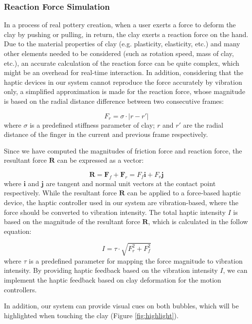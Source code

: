 \documentclass{svjour3}                     %
\begin{document}
\subsubsection{Reaction Force Simulation}
{\color{blue}
In a process of real pottery creation, when a user exerts a force to deform the clay by pushing or pulling, in return, the clay exerts a reaction force on the hand.
%
Due to the material properties of clay (e.g. plasticity, elasticity, etc.) and many other elements needed to be considered (such as rotation speed, mass of clay, etc.), an accurate calculation of the reaction force can be quite complex, which might be an overhead for real-time interaction.
%
In addition, considering that the haptic devices in our system cannot reproduce the force accurately by vibration only, a simplified approximation is made for the reaction force, whose magnitude is based on the radial distance difference between two consecutive frames:

\begin{equation}
F_{r} = \sigma \cdot |r - r'|
\end{equation}
where $\sigma$ is a predefined stiffness parameter of clay; $r$ and $r'$ are the radial distance of the finger in the current and previous frame respectively.

Since we have computed the magnitudes of friction force and reaction force, the resultant force $\mathbf{R}$ can be expressed as a vector:

\begin{equation}
\mathbf{R} = \mathbf{F}_{f} + \mathbf{F}_{r} = F_{f} \mathbf{i} + F_{r} \mathbf{j}
\end{equation}
where $\mathbf{i}$ and $\mathbf{j}$ are tangent and normal unit vectors at the contact point respectively.
While the resultant force $\mathbf{R}$ can be applied to a force-based haptic device, the haptic controller used in our system are vibration-based, where the force should be converted to vibration intensity.
The total haptic intensity $I$ is based on the magnitude of the resultant force $\mathbf{R}$, which is calculated in the follow equation:

\begin{equation}
I = \tau \cdot \sqrt{F_{r}^2 + F_{f}^2}
\end{equation}
where $\tau$ is a predefined parameter for mapping the force magnitude to vibration intensity.
By providing haptic feedback based on the vibration intensity $I$, we can implement the haptic feedback based on clay deformation for the motion controllers.}
In addition, our system can provide visual cues on both bubbles, which will be highlighted when touching the clay (Figure \ref{fig:highlight}).
\end{document}
